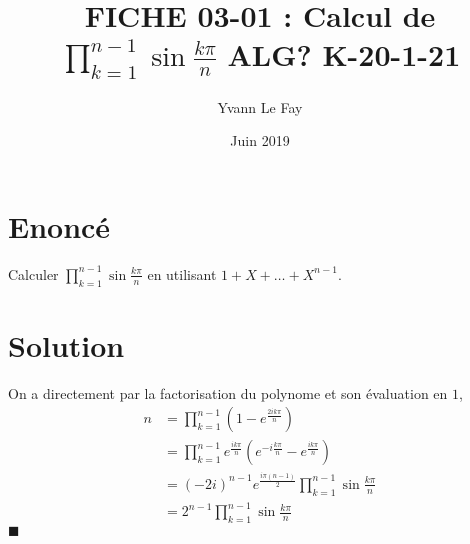 \documentclass{article}
\newcommand*{\QED}{\hfill\ensuremath{\blacksquare}}%
\begin{document}
\title{FICHE 03-01 : Calcul de $\prod_{k=1}^{n-1}\sin{\frac{k\pi}{n}}$ ALG? K-20-1-21}
\author{Yvann Le Fay}
\date{Juin 2019}
\maketitle
\section*{Enoncé}
Calculer $\prod_{k=1}^{n-1}\sin{\frac{k\pi}{n}}$ en utilisant $1+X+\ldots+X^{n-1}$.
\section*{Solution}
On a directement par la factorisation du polynome et son évaluation en $1$,
\begin{align*}
n & = \prod_{k=1}^{n-1}(1-e^{\frac{2i k\pi}{n}})\\
&=\prod_{k=1}^{n-1}e^{\frac{i k\pi}{n}}(e^{-i\frac{k\pi}{n}}-e^{\frac{i k\pi}{n}})\\
&=(-2i)^{n-1}e^{\frac{i\pi(n-1)}{2}}\prod_{k=1}^{n-1}\sin{\frac{k\pi}{n}}\\
&=2^{n-1}\prod_{k=1}^{n-1}\sin{\frac{k\pi}{n}}
\end{align*}
\QED
\end{document}
